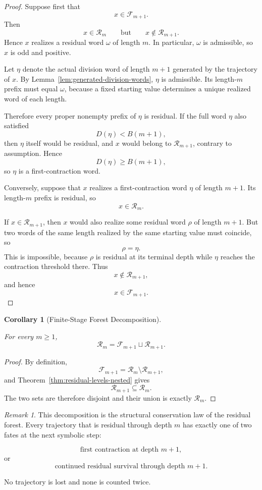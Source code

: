 \documentclass[12pt, oneside]{article}
\numberwithin{equation}{section}
\theoremstyle{definition}
\theoremstyle{plain}
\newtheorem{corollary}[theorem]{Corollary}
\theoremstyle{remark}
\newtheorem*{remark}{Remark}
\begin{document}
\begin{proof}
Suppose first that
\[
x\in\mathcal F_{m+1}.
\]
Then
\[
x\in\mathcal R_m
\qquad\text{but}\qquad
x\notin\mathcal R_{m+1}.
\]
Hence \(x\) realizes a residual word \(\omega\) of length \(m\).
In particular, \(\omega\) is admissible, so \(x\) is odd and positive.

Let \(\eta\) denote the actual division word of length \(m+1\) generated by
the trajectory of \(x\). By
Lemma~\ref{lem:generated-division-words}, \(\eta\) is admissible. Its
length-\(m\) prefix must equal \(\omega\), because a fixed starting value
determines a unique realized word of each length.

Therefore every proper nonempty prefix of \(\eta\) is residual. If the full
word \(\eta\) also satisfied
\[
D(\eta)<B(m+1),
\]
then \(\eta\) itself would be residual, and \(x\) would belong to
\(\mathcal R_{m+1}\), contrary to assumption. Hence
\[
D(\eta)\ge B(m+1),
\]
so \(\eta\) is a first-contraction word.

Conversely, suppose that \(x\) realizes a first-contraction word \(\eta\) of
length \(m+1\). Its length-\(m\) prefix is residual, so
\[
x\in\mathcal R_m.
\]

If \(x\in\mathcal R_{m+1}\), then \(x\) would also realize some residual word
\(\rho\) of length \(m+1\). But two words of the same length realized by the
same starting value must coincide, so
\[
\rho=\eta.
\]
This is impossible, because \(\rho\) is residual at its terminal depth while
\(\eta\) reaches the contraction threshold there. Thus
\[
x\notin\mathcal R_{m+1},
\]
and hence
\[
x\in\mathcal F_{m+1}.
\]
\end{proof}

\begin{corollary}[Finite-Stage Forest Decomposition]
\label{cor:residual-forest-decomposition}

For every \(m\ge1\),
\[
\boxed{
\mathcal R_m
=
\mathcal F_{m+1}
\sqcup
\mathcal R_{m+1}.
}
\]
\end{corollary}

\begin{proof}
By definition,
\[
\mathcal F_{m+1}
=
\mathcal R_m\setminus\mathcal R_{m+1},
\]
and Theorem~\ref{thm:residual-levels-nested} gives
\[
\mathcal R_{m+1}\subseteq\mathcal R_m.
\]
The two sets are therefore disjoint and their union is exactly
\(\mathcal R_m\).
\end{proof}

\begin{remark}
This decomposition is the structural conservation law of the residual
forest. Every trajectory that is residual through depth \(m\) has exactly
one of two fates at the next symbolic step:

\[
\text{first contraction at depth }m+1,
\]
or
\[
\text{continued residual survival through depth }m+1.
\]

No trajectory is lost and none is counted twice.
\end{remark}
\end{document}
